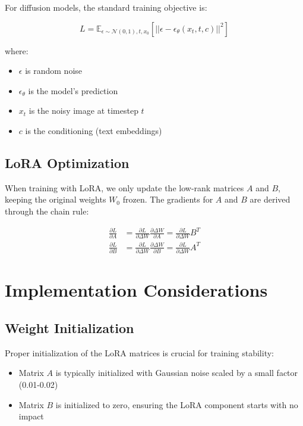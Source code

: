 \documentclass{article}
\begin{document}
For diffusion models, the standard training objective is:

\begin{equation}
L = \mathbb{E}_{\epsilon \sim \mathcal{N}(0,1), t, x_0}[||\epsilon - \epsilon_\theta(x_t, t, c)||^2]
\end{equation}

where:
\begin{itemize}
    \item $\epsilon$ is random noise
    \item $\epsilon_\theta$ is the model's prediction
    \item $x_t$ is the noisy image at timestep $t$
    \item $c$ is the conditioning (text embeddings)
\end{itemize}

\subsection{LoRA Optimization}

When training with LoRA, we only update the low-rank matrices $A$ and $B$, keeping the original weights $W_0$ frozen. The gradients for $A$ and $B$ are derived through the chain rule:

\begin{align}
\frac{\partial L}{\partial A} &= \frac{\partial L}{\partial \Delta W} \frac{\partial \Delta W}{\partial A} = \frac{\partial L}{\partial \Delta W}B^T \\
\frac{\partial L}{\partial B} &= \frac{\partial L}{\partial \Delta W} \frac{\partial \Delta W}{\partial B} = \frac{\partial L}{\partial \Delta W}A^T
\end{align}

\section{Implementation Considerations}

\subsection{Weight Initialization}

Proper initialization of the LoRA matrices is crucial for training stability:

\begin{itemize}
    \item Matrix $A$ is typically initialized with Gaussian noise scaled by a small factor (0.01-0.02)
    \item Matrix $B$ is initialized to zero, ensuring the LoRA component starts with no impact
\end{itemize}
\end{document}
